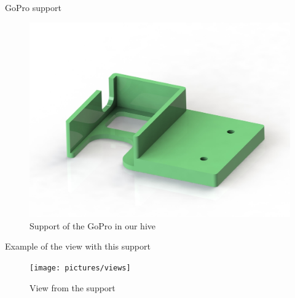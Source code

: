 \documentclass{beamer}
\begin{document}
\begin{frame}{GoPro support}
\begin{figure}
\includegraphics[scale=0.15]{pictures/sup}
\caption{Support of the GoPro in our hive}
\end{figure}
\end{frame}


\begin{frame}{Example of the view with this support}

\begin{figure}
\texttt{[image: pictures/views]}
\caption{View from the support}
\end{figure}
\end{frame}
\end{document}
